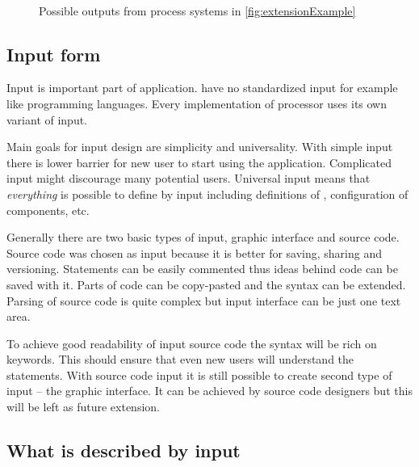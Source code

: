 \begin{figure}[h]
	\centering
	 ~
	\caption{Possible outputs from process systems in \autoref{fig:extensionExample}}
	\label{fig:extensionExampleResult}
\end{figure}


\subsection{Input form}

Input is important part of application.
\lsystems have no standardized input for example like programming languages.
Every implementation of \lsystem processor uses its own variant of input.

Main goals for input design are simplicity and universality.
With simple input there is lower barrier for new user to start using the application.
Complicated input might discourage many potential users.
Universal input means that \textit{everything} is possible to define by input including definitions of \lsystems, configuration of components, etc.

Generally there are two basic types of input, graphic interface and source code.
Source code was chosen as input because it is better for saving, sharing and versioning.
Statements can be easily commented thus ideas behind code can be saved with it.
Parts of code can be copy-pasted and the syntax can be extended.
Parsing of source code is quite complex but input interface can be just one text area.


To achieve good readability of input source code the syntax will be rich on keywords.
This should ensure that even new users will understand the statements.
With source code input it is still possible to create second type of input -- the graphic interface.
It can be achieved by source code designers but this will be left as future extension.


\subsection{What is described by input}

